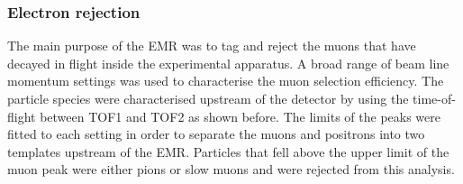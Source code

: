 \subsubsection{Electron rejection}
The main purpose of the EMR was to tag and reject the muons that have decayed in flight inside the experimental apparatus. A broad range of beam line momentum settings
was used to characterise the muon selection efficiency. The particle species were characterised upstream of the detector by using the time-of-flight between TOF1 and TOF2 as shown before.
The limits of the peaks were fitted to each setting in order to separate the muons and positrons into two templates upstream of the EMR. Particles that fell above the upper limit of the muon peak were either pions or slow muons and were rejected from this analysis.

